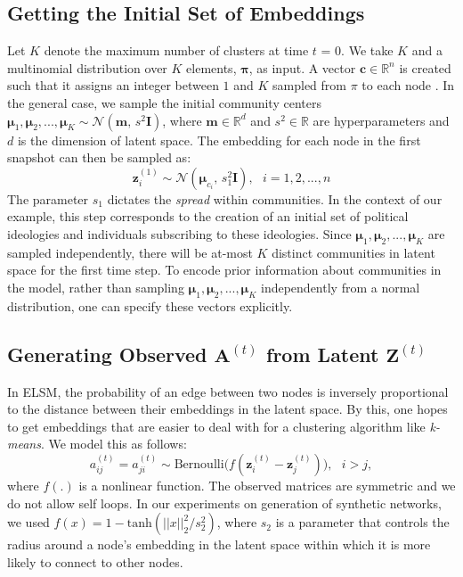 \documentclass[letterpaper]{article} %
\begin{document}
\subsection{Getting the Initial Set of Embeddings}
\label{section:gettinginitialsetofembeddings}
Let $K$ denote the maximum number of clusters at time $t$ = 0. We take $K$ and a multinomial distribution over $K$ elements, $\mathbf{\pi}$, as input. A vector $\mathbf{c} \in \mathbb{R}^n$ is created such that it assigns an integer between $1$ and $K$ sampled from $\pi$ to each node . In the general case, we sample the initial community centers $\bm{\mu}_1, \bm{\mu}_2, ..., \bm{\mu}_K \sim \mathcal{N}(\mathbf{m},\, s^2\mathbf{I})$, where $\mathbf{m} \in \mathbb{R}^d$ and $s^2 \in \mathbb{R}$ are hyperparameters and $d$ is the dimension of latent space. The embedding for each node in the first snapshot can then be sampled as:
\begin{equation}
    \label{eq:initial-assignment}
    \mathbf{z}^{(1)}_i \sim \mathcal{N}(\bm{\mu}_{c_i},\, s_1^2\mathbf{I}), \,\,\,\, i=1, 2, ..., {n}
\end{equation}
The parameter $s_1$ dictates the \textit{spread} within communities. In the context of our example, this step corresponds to the creation of an initial set of political ideologies and individuals subscribing to these ideologies. Since $\bm{\mu}_1, \bm{\mu}_2, ..., \bm{\mu}_K$ are sampled independently, there will be at-most $K$ distinct communities in latent space for the first time step. To encode prior information about communities in the model, rather than sampling $\bm{\mu}_1, \bm{\mu}_2, ..., \bm{\mu}_K$ independently from a normal distribution, one can specify these vectors explicitly.


\subsection{Generating  Observed $\mathbf{A}^{(t)}$ from Latent $\mathbf{Z}^{(t)}$}
\label{section:generatingobservedatfromlatentzt}
In ELSM, the probability of an edge between two nodes is inversely proportional to the distance between their embeddings in the latent space. By this, one hopes to get embeddings that are easier to deal with for a clustering algorithm like \textit{k-means}. We model this as follows:
\begin{equation}
    \label{eq:observedgivenlatent}
    a_{ij}^{(t)} = a_{ji}^{(t)} \sim \mathrm{Bernoulli}\Big(f(\mathbf{z}_i^{(t)} - \mathbf{z}_j^{(t)})\Big), \,\,\,\, i > j,
\end{equation}
where $f(.)$ is a nonlinear function. The observed matrices are symmetric and we do not allow self loops. In our experiments on generation of synthetic networks, we used $f(x) = 1 - \mathrm{tanh}(||x||_2^2/{s}_2^2)$, where ${s}_2$ is a parameter that controls the radius around a node's embedding in the latent space within which it is more likely to connect to other nodes.
\end{document}
